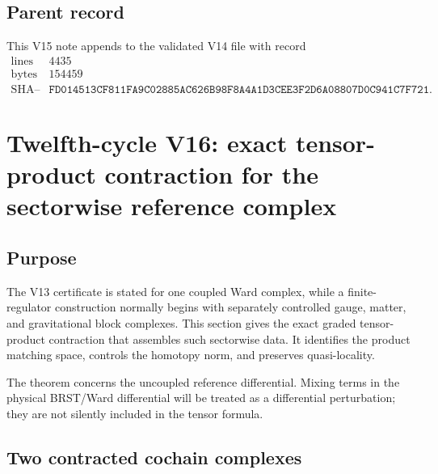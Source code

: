 \documentclass[11pt]{article}
\theoremstyle{remark}
\begin{document}
\subsection{Parent record}

This V15 note appends to the validated V14 file with record
\[
\begin{array}{c|c}
\text{lines}&4435\\
\text{bytes}&154459\\
\text{SHA--256}&
\texttt{FD014513CF811FA9C02885AC626B98F8A4A1D3CEE3F2D6A08807D0C941C7F721}.
\end{array}
\]


\section{Twelfth-cycle V16: exact tensor-product contraction for the
sectorwise reference complex}
\label{sec:v12v16}

\subsection{Purpose}

The V13 certificate is stated for one coupled Ward complex, while a
finite-regulator construction normally begins with separately
controlled gauge, matter, and gravitational block complexes.  This
section gives the exact graded tensor-product contraction that
assembles such sectorwise data.  It identifies the product matching
space, controls the homotopy norm, and preserves quasi-locality.

The theorem concerns the uncoupled reference differential.  Mixing
terms in the physical BRST/Ward differential will be treated as a
differential perturbation; they are not silently included in the
tensor formula.

\subsection{Two contracted cochain complexes}
\end{document}
